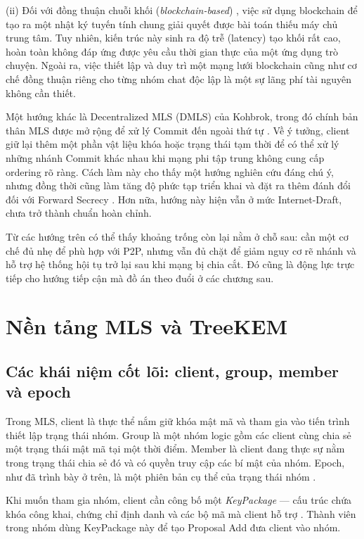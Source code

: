 \documentclass[../DoAn.tex]{subfiles}
\begin{document}
(ii) Đối với đồng thuận chuỗi khối (\textit{blockchain-based}) \cite{nakamoto2008bitcoin}, việc sử dụng blockchain để tạo ra một nhật ký tuyến tính chung giải quyết được bài toán thiếu máy chủ trung tâm. Tuy nhiên, kiến trúc này sinh ra độ trễ (latency) tạo khối rất cao, hoàn toàn không đáp ứng được yêu cầu thời gian thực của một ứng dụng trò chuyện. Ngoài ra, việc thiết lập và duy trì một mạng lưới blockchain cũng như cơ chế đồng thuận riêng cho từng nhóm chat độc lập là một sự lãng phí tài nguyên không cần thiết.

Một hướng khác là Decentralized MLS (DMLS) của Kohbrok, trong đó chính bản thân MLS được mở rộng để xử lý Commit đến ngoài thứ tự \cite{kohbrok2025dmls}. Về ý tưởng, client giữ lại thêm một phần vật liệu khóa hoặc trạng thái tạm thời để có thể xử lý những nhánh Commit khác nhau khi mạng phi tập trung không cung cấp ordering rõ ràng. Cách làm này cho thấy một hướng nghiên cứu đáng chú ý, nhưng đồng thời cũng làm tăng độ phức tạp triển khai và đặt ra thêm đánh đổi đối với Forward Secrecy \cite{alwen2023fork,kohbrok2025dmls}. Hơn nữa, hướng này hiện vẫn ở mức Internet-Draft, chưa trở thành chuẩn hoàn chỉnh.

Từ các hướng trên có thể thấy khoảng trống còn lại nằm ở chỗ sau: cần một cơ chế đủ nhẹ để phù hợp với P2P, nhưng vẫn đủ chặt để giảm nguy cơ rẽ nhánh và hỗ trợ hệ thống hội tụ trở lại sau khi mạng bị chia cắt. Đó cũng là động lực trực tiếp cho hướng tiếp cận mà đồ án theo đuổi ở các chương sau.

\section{Nền tảng MLS và TreeKEM}
\label{sec:nen-tang-mls-treekem}

\subsection{Các khái niệm cốt lõi: client, group, member và epoch}

Trong MLS, client là thực thể nắm giữ khóa mật mã và tham gia vào tiến trình thiết lập trạng thái nhóm. Group là một nhóm logic gồm các client cùng chia sẻ một trạng thái mật mã tại một thời điểm. Member là client đang thực sự nằm trong trạng thái chia sẻ đó và có quyền truy cập các bí mật của nhóm. Epoch, như đã trình bày ở trên, là một phiên bản cụ thể của trạng thái nhóm \cite{rfc9420}.

Khi muốn tham gia nhóm, client cần công bố một \textit{KeyPackage} --- cấu trúc chứa khóa công khai, chứng chỉ định danh và các bộ mã mà client hỗ trợ \cite{rfc9420}. Thành viên trong nhóm dùng KeyPackage này để tạo Proposal Add đưa client vào nhóm.
\end{document}
